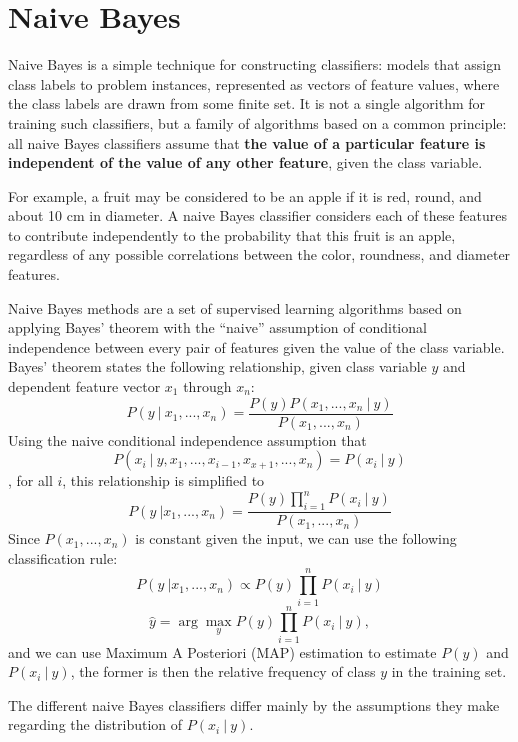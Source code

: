 \documentclass[a4paper, 11pt]{article}
\begin{document}
\section{Naive Bayes}

Naive Bayes is a simple technique for constructing classifiers: models that assign class labels to problem instances, represented as vectors of feature values, where the class labels are drawn from some finite set. It is not a single algorithm for training such classifiers, but a family of algorithms based on a common principle: all naive Bayes classifiers assume that \textbf{the value of a particular feature is independent of the value of any other feature}, given the class variable.

For example, a fruit may be considered to be an apple if it is red, round, and about 10 cm in diameter. A naive Bayes classifier considers each of these features to contribute independently to the probability that this fruit is an apple, regardless of any possible correlations between the color, roundness, and diameter features.

Naive Bayes methods are a set of supervised learning algorithms based on applying Bayes’ theorem with the ``naive'' assumption of conditional independence between every pair of features given the value of the class variable. Bayes’ theorem states the following relationship, given class variable $y$ and dependent feature vector $x_1$ through $x_n$:
$$P(y\ |\ x_1,...,x_n)=\frac{P(y)P(x_1,...,x_n\ |\ y)}{P(x_1,...,x_n)}$$
Using the naive conditional independence assumption that 
$$P(x_i\ |\ y,x_1,...,x_{i-1},x_{x+1},...,x_n)=P(x_i\ |\ y)$$,
for all $i$, this relationship is simplified to 
$$P(y\ | x_1,...,x_n)=\frac{P(y)\prod_{i=1}^n P(x_i\ |\ y)}{P(x_1,...,x_n)}$$
Since $P(x_1,...,x_n)$ is constant given the input, we can use the following classification rule:
$$P(y\ | x_1,...,x_n)\propto P(y)\prod_{i=1}^n P(x_i\ |\ y)$$
$$\hat{y}=\arg\max\limits_y P(y)\prod^n_{i=1}P(x_i\ |\ y),$$
and we can use Maximum A Posteriori (MAP) estimation to estimate $P(y)$ and $P(x_i\ |\ y)$, the former is then the relative frequency of class $y$ in the training set.

The different naive Bayes classifiers differ mainly by the assumptions they make regarding the distribution of $P(x_i\ |\ y)$.
\end{document}
